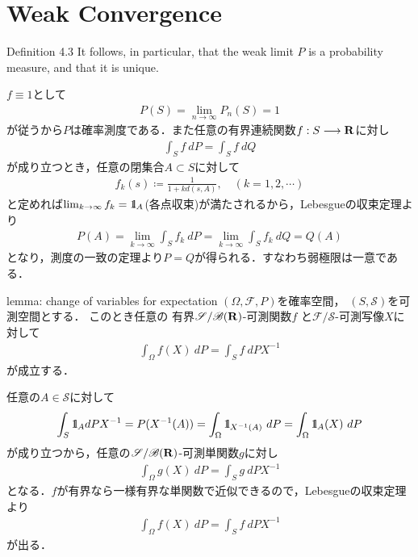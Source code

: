 \section{Weak Convergence}
	\begin{itembox}[l]{Definition 4.3}
		It follows, in particular, that the weak limit $P$ is a probability measure, 
		and that it is unique.
	\end{itembox}
	
	\begin{prf}
		$f \equiv 1$として
		\begin{align}
			P(S) = \lim_{n \to \infty} P_n(S) = 1
		\end{align}
		が従うから$P$は確率測度である．また任意の有界連続関数$f:S \longrightarrow \mathbf{R}$に対し
		\begin{align}
			\int_S f\ dP = \int_S f\ dQ
		\end{align}
		が成り立つとき，任意の閉集合$A \subset S$に対して
		\begin{align}
			f_k(s) \coloneqq \frac{1}{1 + k d(s,A)},
			\quad (k=1,2,\cdots)
		\end{align}
		と定めれば$\lim_{k \to \infty} f_k = \mbox{1}\hspace{-0.25em}\mbox{l}_A$(各点収束)が満たされるから，Lebesgueの収束定理より
		\begin{align}
			P(A) = \lim_{k \to \infty} \int_S f_k\ dP
			= \lim_{k \to \infty} \int_S f_k\ dQ
			= Q(A)
		\end{align}
		となり，測度の一致の定理より$P = Q$が得られる．すなわち弱極限は一意である．
		\QED
	\end{prf}
	
	\begin{itembox}[l]{lemma: change of variables for expectation}
		$(\Omega,\mathscr{F},P)$を確率空間，
		$(S,\mathscr{S})$を可測空間とする．
		このとき任意の
		有界$\mathscr{S}/\mathscr{B}(\mathbf{R})$-可測関数$f$
		と$\mathscr{F}/\mathscr{S}$-可測写像$X$に対して
		\begin{align}
			\int_\Omega f(X)\ dP = \int_S f\ dPX^{-1}
		\end{align}
		が成立する．
	\end{itembox}
	
	\begin{prf}
		任意の$A \in \mathscr{S}$に対して
		\begin{align}
			\int_S \mbox{1}\hspace{-0.25em}\mbox{l}_A dPX^{-1}
			= P(X^{-1}(A))
			= \int_\Omega \mbox{1}\hspace{-0.25em}\mbox{l}_{X^{-1}(A)}\ dP
			= \int_\Omega \mbox{1}\hspace{-0.25em}\mbox{l}_{A}(X)\ dP
		\end{align}
		が成り立つから，任意の$\mathscr{S}/\mathscr{B}(\mathbf{R})$-可測単関数$g$に対し
		\begin{align}
			\int_\Omega g(X)\ dP = \int_S g\ dPX^{-1}
		\end{align}
		となる．$f$が有界なら一様有界な単関数で近似できるので，Lebesgueの収束定理より
		\begin{align}
			\int_\Omega f(X)\ dP = \int_S f\ dPX^{-1}
		\end{align}
		が出る．
		\QED
	\end{prf}
	
